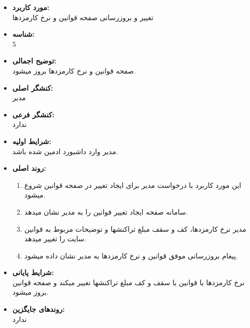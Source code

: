 \documentclass{article}
\begin{document}
\noindent\makebox[\linewidth]{\rule{\paperwidth}{0.4pt}}
\begin{itemize}
\item \textbf{مورد کاربرد:}\\
تغییر و بروزرسانی صفحه قوانین و نرخ کارمزدها
\item \textbf{شناسه:}\\
5
\item \textbf{توضیح اجمالی:}\\
صفحه قوانین و نرخ کارمزدها بروز میشود.
\item \textbf{کنشگر اصلی:}\\
مدیر
\item \textbf{کنشگر فرعی:}\\
ندارد
\item \textbf{شرایط اولیه:}\\
مدیر وارد داشبورد ادمین شده باشد.
\item \textbf{روند اصلی:}\\
\begin{enumerate}
\item  این مورد کاربرد با درخواست مدیر برای ایجاد تغییر در صفحه قوانین شروع میشود.
\item سامانه صفحه  ایجاد تغییر قوانین را به مدیر نشان میدهد.
\item مدیر نرخ کارمزدها، کف و سقف مبلغ تراکنشها و توضیحات مربوط به قوانین سایت را تغییر میدهد.
\item پیغام بروزرسانی موفق قوانین و نرخ کارمزدها به مدیر نشان داده میشود.
\end{enumerate}
\item \textbf{شرایط پایانی:}\\ 
نرخ کارمزدها یا قوانین یا سقف و کف مبلغ تراکنشها تغییر میکند و صفحه قوانین بروز میشود.
\item \textbf{روندهای جایگزین:}\\
ندارد
\end{itemize}

\noindent\makebox[\linewidth]{\rule{\paperwidth}{0.4pt}}
\end{document}

